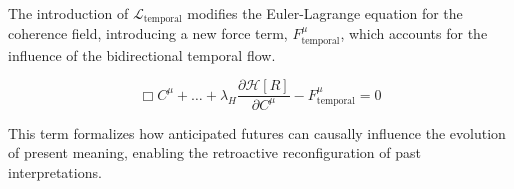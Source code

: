 The introduction of \(\mathcal{L}_{\text{temporal}}\) modifies the Euler-Lagrange equation for the coherence field, introducing a new force term, \(F^\mu_{\text{temporal}}\), which accounts for the influence of the bidirectional temporal flow.

\begin{equation}
\Box C^\mu + \dots + \lambda_H \frac{\partial \mathcal{H}[R]}{\partial C^\mu} - F^\mu_{\text{temporal}} = 0
\end{equation}

This term formalizes how anticipated futures can causally influence the evolution of present meaning, enabling the retroactive reconfiguration of past interpretations.